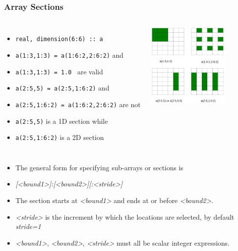 \documentclass[c,mathserif,compress,xcolor=svgnames]{beamer}
\newcommand{\lstfortran}[1]{\lstinline[language={[90]Fortran},basicstyle=\footnotesize\ttfamily]|#1|}
\begin{document}
\begin{frame}
  \frametitle{\small Array Sections}
  \begin{columns}[t]
    \column{7cm}
    \begin{itemize}
      \scriptsize
      \item[] \lstfortran{real, dimension(6:6) :: a}
      \item {\lstfortran{a(1:3,1:3) = a(1:6:2,2:6:2)}} and
      \item[] {\lstfortran{a(1:3,1:3) = 1.0 }} are valid
      \item {\lstfortran{a(2:5,5) = a(2:5,1:6:2)}} and
      \item[] {\lstfortran{a(2:5,1:6:2) = a(1:6:2,2:6:2)}} are not
      \item {\lstfortran{a(2:5,5)}} is a 1D section while 
      \item[] {\lstfortran{a(2:5,1:6:2)}} is a 2D section
    \end{itemize}
    \column{4cm}
    \begin{center}
      \includegraphics[width=4cm,clip=true]{./array6}
    \end{center}
  \end{columns}
  \begin{itemize}
    \scriptsize
    \item The general form for specifying sub-arrays or sections is
    \item[] \textit{[<bound1>]:[<bound2>][:<stride>]}
    \item The section starts at \textit{<bound1>} and ends at or before \textit{<bound2>}.
    \item \textit{<stride>} is the increment by which the locations are selected, by default \textit{stride=1}
    \item \textit{<bound1>}, \textit{<bound2>}, \textit{<stride>} must all be scalar integer expressions.
  \end{itemize}


\end{frame}
\end{document}
